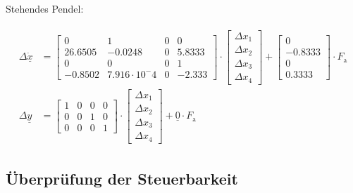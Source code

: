 Stehendes Pendel:

\begin{align}\label{eq:Gleichung33}
    \begin{split}
        \Delta{\dot{\underline{x}}}&=
        \begin{bmatrix}
            0 & 1 & 0 & 0 \\
            26.6505 & -0.0248 & 0 & 5.8333 \\
            0 & 0 & 0 & 1 \\
            -0.8502 & 7.916\cdot10^-4 & 0 & -2.333
        \end{bmatrix}\cdot
        \begin{bmatrix}
            \Delta{x_{\mathrm{1}}} \\ \Delta{x_{\mathrm{2}}} \\         \Delta{x_{\mathrm{3}}} \\ \Delta{x_{\mathrm{4}}}
        \end{bmatrix}+
        \begin{bmatrix}
            0 \\
            -0.8333 \\
            0 \\
            0.3333
        \end{bmatrix}\cdot F_{\mathrm{a}}
        \\
        \Delta{\underline{y}} &=
        \begin{bmatrix}
            1 & 0 & 0 & 0 \\
            0 & 0 & 1 & 0 \\
            0 & 0 & 0 & 1
        \end{bmatrix}\cdot
        \begin{bmatrix}
            \Delta{x_{\mathrm{1}}}\\
            \Delta{x_{\mathrm{2}}}\\
            \Delta{x_{\mathrm{3}}}\\
            \Delta{x_{\mathrm{4}}}
        \end{bmatrix}+\underline{0}\cdot F_{\mathrm{a}}
    \end{split}
\end{align}

\clearpage

\subsection{Überprüfung der Steuerbarkeit} \label{sec:Steuerbarkeit}

